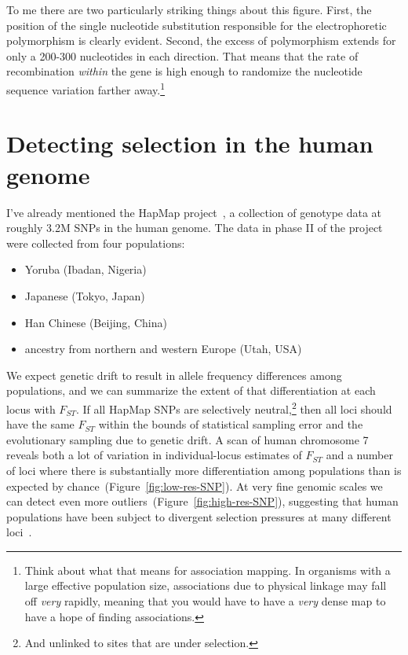 \documentclass[12pt]{article}
\begin{document}
To me there are two particularly striking things about this
figure. First, the position of the single nucleotide substitution
responsible for the electrophoretic polymorphism is clearly
evident. Second, the excess of polymorphism extends for only a 200-300
nucleotides in each direction. That means that the rate of
recombination {\it within\/} the gene is high enough to randomize the
nucleotide sequence variation farther away.\footnote{Think about what
  that means for association mapping. In organisms with a large
  effective population size, associations due to physical linkage may
  fall off {\it very\/} rapidly, meaning that you would have to have a
  {\it very\/} dense map to have a hope of finding associations.}

\section*{Detecting selection in the human genome}

I've already mentioned the HapMap project~\cite{HapMap-2007}, a
collection of genotype data at roughly 3.2M SNPs in the human
genome. The data in phase II of the project were collected from four
populations:

\begin{itemize}

\item Yoruba (Ibadan, Nigeria)

\item Japanese (Tokyo, Japan)

\item Han Chinese (Beijing, China)

\item ancestry from northern and western Europe (Utah, USA)

\end{itemize}

We expect genetic drift to result in allele frequency differences
among populations, and we can summarize the extent of that
differentiation at each locus with $F_{ST}$. If all HapMap SNPs are
selectively neutral,\footnote{And unlinked to sites that are under
  selection.} then all loci should have the same $F_{ST}$ within the
bounds of statistical sampling error and the evolutionary sampling due
to genetic drift. A scan of human chromosome 7 reveals both a lot of
variation in individual-locus estimates of $F_{ST}$ and a number of
loci where there is substantially more differentiation among
populations than is expected by
chance~(Figure~\ref{fig:low-res-SNP}). At very fine genomic scales we
can detect even more outliers~(Figure~\ref{fig:high-res-SNP}),
suggesting that human populations have been subject to divergent
selection pressures at many different loci~\cite{Guo-etal-2009}.
\end{document}
